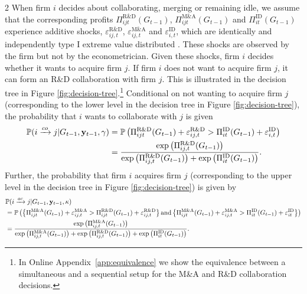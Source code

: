 \documentclass[12pt]{article}
\begin{document}
\begin{spacing}{2}
When firm $i$ decides about collaborating, merging or remaining idle, we assume that the corresponding profits $\Pi_{ijt}^{\text{R\&D}}(G_{t-1})$, $\Pi_{ijt}^{\text{M\&A}}(G_{t-1})$ and $\Pi_{it}^{\text{ID}}(G_{t-1})$ experience additive shocks,  $\varepsilon^{\text{R\&D}}_{ij,t}$, $\varepsilon^{\text{M\&A}}_{ij,t}$ and $\varepsilon^{\text{ID}}_{i,t}$, which are identically and independently type I extreme value distributed \citep[][]{McFADDEN1974,train2009discrete}. These shocks are observed by the firm but not by the econometrician. Given these shocks, firm $i$ decides whether it wants to acquire firm $j$. If firm $i$ does not want to acquire firm $j$, it can form an R\&D collaboration with firm $j$. This is illustrated in the decision tree in Figure \ref{fig:decision-tree}.\footnote{In Online Appendix~\ref{app:equivalence} we show the equivalence between a simultaneous and a sequential setup for the M\&A and R\&D collaboration decisions.} Conditional on not wanting to acquire firm $j$ (corresponding to the lower level in the decision tree in Figure \ref{fig:decision-tree}), the probability that $i$ wants to collaborate with $j$ is given %
\begin{align}
\mathbb{P}(i \xrightarrow{co} j|G_{t-1},\mathbf{y}_{t-1},\gamma) & = 
\mathbb{P}\left(
\Pi_{ijt}^{\text{R\&D}}(G_{t-1}) + \varepsilon^{\text{R\&D}}_{ij,t} 
>
\Pi_{it}^{\text{ID}}(G_{t-1})+
\varepsilon^{\text{ID}}_{i,t}
\right) 
\notag \\
& = \frac{\exp\left(\Pi^{\rm R\&D}_{ij,t}(G_{t-1})\right)}{\exp\left(\Pi^{\rm R\&D}_{ij,t}(G_{t-1})\right)+\exp\left(\Pi^{\rm ID}_{it}(G_{t-1})\right)}.
\label{eq:i-co-j}
\end{align}
Further, the probability that firm $i$ acquires firm $j$ (corresponding to the upper level in the decision tree in Figure \ref{fig:decision-tree}) is given by
\begin{align}
& \mathbb{P}(i \xrightarrow{ac} j|G_{t-1},\mathbf{y}_{t-1},\kappa) \notag \\
& = 
\mathbb{P}\left(
\left\{
\Pi_{ijt}^{\text{M\&A}}(G_{t-1}) + \varepsilon^{\text{M\&A}}_{ij,t}
>
\Pi_{ijt}^{\text{R\&D}}(G_{t-1}) + \varepsilon^{\text{R\&D}}_{ij,t}
\right\}
\text{and} 
\left\{
\Pi_{ijt}^{\text{M\&A}}(G_{t-1}) + \varepsilon^{\text{M\&A}}_{ij,t}
>
\Pi_{it}^{\text{ID}}(G_{t-1}) + \varepsilon^{\text{ID}}_{it}
\right\}
\right) 
\notag \\
& 
=
\frac{\exp\left(\Pi^{\rm M\&A}_{ij,t}(G_{t-1})\right)}{\exp\left(\Pi^{\rm M\&A}_{ij,t}(G_{t-1})\right)+\exp\left(\Pi^{\rm R\&D}_{ij,t}(G_{t-1})\right)+\exp\left(\Pi^{\rm ID}_{it}(G_{t-1})\right)}.

\end{align}
\end{spacing}
\end{document}
